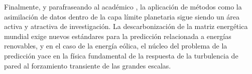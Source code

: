 Finalmente, y parafraseando al académico \cite{doi:10.1080/14685248.2019.1584664}, la aplicación de métodos como la asimilación de datos dentro de la capa límite planetaria sigue siendo un área activa y atractiva de investigación. La descarbonización de la matriz energética mundial exige nuevos estándares para la predicción relacionada a energías renovables, y en el caso de la energía eólica, el núcleo del problema de la predicción yace en la física fundamental de la respuesta de la turbulencia de pared al forzamiento transiente de las grandes escalas.

